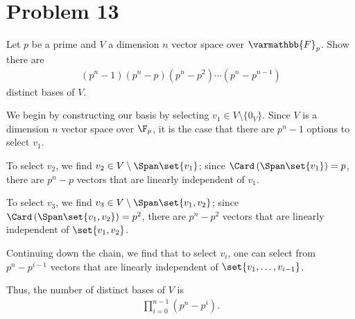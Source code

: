 \documentclass[10pt]{mypackage}
\renewcommand*{\mathbb}[1]{\varmathbb{#1}}
\begin{document}
\section{Problem 13}%
\begin{problem}
  Let $p$ be a prime and $V$ a dimension $n$ vector space over $\mathbb{F}_p$. Show there are
  \begin{align*}
    \left(p^n-1\right)\left(p^n - p\right)\left(p^n - p^2\right)\cdots \left(p^n - p^{n-1}\right)
  \end{align*}
  distinct bases of $V$.
\end{problem}
\begin{solution}
  We begin by constructing our basis by selecting $v_1 \in V\setminus \{0_V\}$. Since $V$ is a dimension $n$ vector space over $\F_p$, it is the case that there are $p^n - 1$ options to select $v_1$.\newline

  To select $v_2$, we find $v_2\in V\setminus \Span\set{v_1}$; since $\Card\left(\Span\set{v_1}\right) = p$, there are $p^n - p$ vectors that are linearly independent of $v_1$.\newline

  To select $v_3$, we find $v_3 \in V\setminus \Span\set{v_1,v_2}$; since $\Card\left(\Span\set{v_1,v_2}\right) = p^2$, there are $p^n - p^2$ vectors that are linearly independent of $\set{v_1,v_2}$.\newline

  Continuing down the chain, we find that to select $v_i$, one can select from $p^n - p^{i-1}$ vectors that are linearly independent of $\set{v_1,\dots,v_{i-1}}$.\newline

  Thus, the number of distinct bases of $V$ is
  \begin{align*}
    \prod_{i=0}^{n-1}\left(p^n - p^{i}\right).
  \end{align*}
\end{solution}
\end{document}
